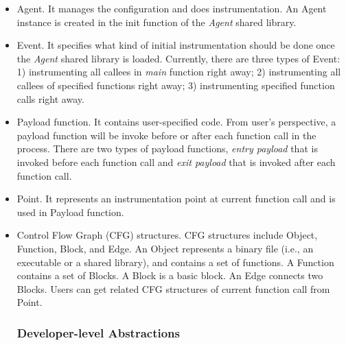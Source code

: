 \begin{itemize}
\item Agent. It manages the configuration and does instrumentation. An Agent
  instance is created in the init function of the {\em Agent} shared library.
\item Event. It specifies what kind of initial instrumentation should be done
  once the {\em Agent} shared library is loaded. 
  Currently, there are three types of Event: 1) instrumenting all callees in {\em
  main} function right away; 2) instrumenting all callees of specified functions
  right away; 3) instrumenting specified function calls right away.
\item Payload function. It contains user-specified code. 
  From user's perspective, a payload function will be invoke before or after each
  function call in the process.
  There are two types of payload functions, {\em entry payload} that is invoked
  before each function call and {\em exit payload} that is invoked after each
  function call.
\item Point. It represents an instrumentation point at current function call and
  is used in Payload function.
\item Control Flow Graph (CFG) structures. CFG structures include Object,
  Function, Block, and Edge. An Object represents a binary file (i.e., an
  executable or a shared library), and contains a set of functions. A Function
  contains a set of Blocks. A Block is a basic block. An Edge connects two
  Blocks. Users can get related CFG structures of current function call from
  Point.

\subsubsection{Developer-level Abstractions}


\end{itemize}
